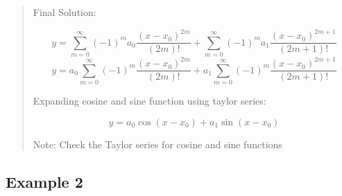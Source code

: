 \documentclass[
  letterpaper,
  DIV=11,
  numbers=noendperiod]{scrreprt}
\theoremstyle{plain}
\theoremstyle{remark}
\begin{document}
\begin{tcolorbox}
\begin{quote}
Final Solution:

\[y=\sum_{m=0}^\infty (-1)^m a_0 \frac{(x-x_0)^{2m}}{(2m)!}+\sum_{m=0}^\infty (-1)^m a_1 \frac{(x-x_0)^{2m+1}}{(2m+1)!}\]
\[y=a_0\sum_{m=0}^\infty (-1)^m  \frac{(x-x_0)^{2m}}{(2m)!}+a_1\sum_{m=0}^\infty (-1)^m  \frac{(x-x_0)^{2m+1}}{(2m+1)!}\]

Expanding cosine and sine function using taylor series:

\[\boxed{y=a_0\cos(x-x_0)+a_1\sin(x-x_0)}\]

Note: Check the Taylor series for cosine and sine
functions\footnotemark{}
\end{quote}

\end{tcolorbox}




\subsection{Example 2}\label{example-2-1}
\end{document}
